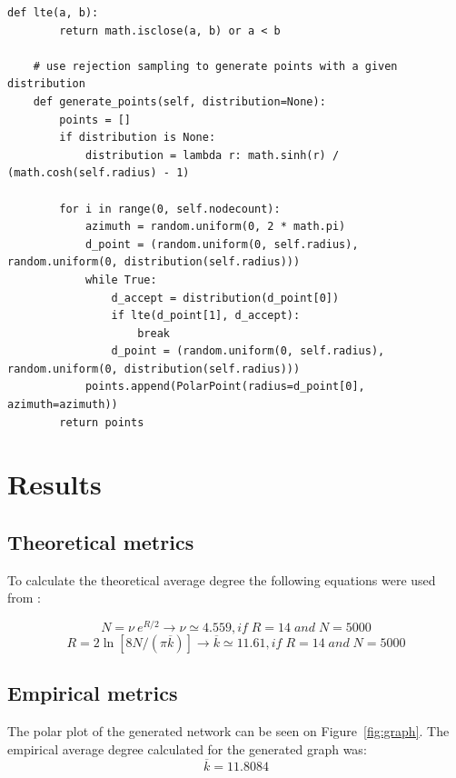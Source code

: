 \documentclass[a4paper]{article}
\begin{document}
\begin{lstlisting}[style=mypython,caption={The function used for generating random nodes},label={lst:python}]
    def lte(a, b):
        return math.isclose(a, b) or a < b
	
    # use rejection sampling to generate points with a given distribution
    def generate_points(self, distribution=None):
        points = []
        if distribution is None:
            distribution = lambda r: math.sinh(r) / (math.cosh(self.radius) - 1)

        for i in range(0, self.nodecount):
            azimuth = random.uniform(0, 2 * math.pi)
            d_point = (random.uniform(0, self.radius), random.uniform(0, distribution(self.radius)))
            while True:
                d_accept = distribution(d_point[0])
                if lte(d_point[1], d_accept):
                    break
                d_point = (random.uniform(0, self.radius), random.uniform(0, distribution(self.radius)))
            points.append(PolarPoint(radius=d_point[0], azimuth=azimuth))
        return points
\end{lstlisting}

\section{Results}
\subsection{Theoretical metrics}
To calculate the theoretical average degree the following equations were used from \cite{HyperbolicGeoNetworks}:

\begin{equation}
N = \nu~e^{R/2} \rightarrow \nu \simeq 4.559 ,if\;R=14\;and\;N=5000
\end{equation}
\begin{equation}
R = 2 \ln[8 N / (\pi \overline{k})] \rightarrow \overline{k} \simeq 11.61, if\;R=14\;and\;N=5000
\end{equation}

\subsection{Empirical metrics}\label{sect:metrics}

The polar plot of the generated network can be seen on Figure~\ref{fig:graph}. The empirical average degree calculated for the generated graph was:
\begin{equation}
\overline{k} =  11.8084
\end{equation}
\end{document}
